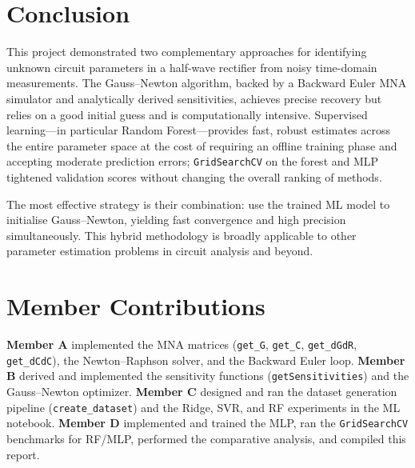 \documentclass[journal,twocolumn]{IEEEtran}
\begin{document}
\section{Conclusion}
\label{sec:conclusion}

This project demonstrated two complementary approaches for identifying unknown circuit parameters in a half-wave rectifier from noisy time-domain measurements. The Gauss--Newton algorithm, backed by a Backward Euler MNA simulator and analytically derived sensitivities, achieves precise recovery but relies on a good initial guess and is computationally intensive. Supervised learning---in particular Random Forest---provides fast, robust estimates across the entire parameter space at the cost of requiring an offline training phase and accepting moderate prediction errors; \texttt{GridSearchCV} on the forest and MLP tightened validation scores without changing the overall ranking of methods.

The most effective strategy is their combination: use the trained ML model to initialise Gauss--Newton, yielding fast convergence and high precision simultaneously. This hybrid methodology is broadly applicable to other parameter estimation problems in circuit analysis and beyond.

\section*{Member Contributions}

\textbf{Member A} implemented the MNA matrices (\texttt{get\_G}, \texttt{get\_C}, \texttt{get\_dGdR}, \texttt{get\_dCdC}), the Newton--Raphson solver, and the Backward Euler loop. \textbf{Member B} derived and implemented the sensitivity functions (\texttt{getSensitivities}) and the Gauss--Newton optimizer. \textbf{Member C} designed and ran the dataset generation pipeline (\texttt{create\_dataset}) and the Ridge, SVR, and RF experiments in the ML notebook. \textbf{Member D} implemented and trained the MLP, ran the \texttt{GridSearchCV} benchmarks for RF/MLP, performed the comparative analysis, and compiled this report.
\end{document}

